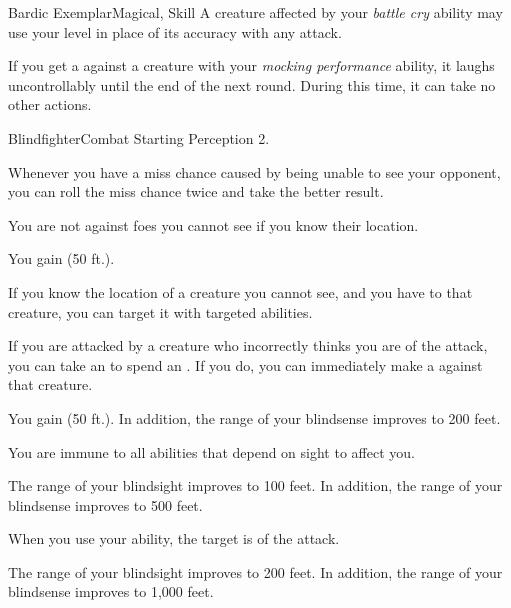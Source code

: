 \begin{feat}{Bardic Exemplar}{Magical, Skill}
         A creature affected by your \textit{battle cry} ability may use your level in place of its accuracy with any attack.

         If you get a  against a creature with your \textit{mocking performance} ability, it laughs uncontrollably until the end of the next round.
        During this time, it can take no other actions.
    \end{feat}

    \begin{feat}{Blindfighter}{Combat}
        \featpre Starting Perception 2.
        \featben
        
         Whenever you have a miss chance caused by being unable to see your opponent, you can roll the miss chance twice and take the better result.

         You are not  against foes you cannot see if you know their location.

         You gain  (50 ft.).

         If you know the location of a creature you cannot see, and you have  to that creature, you can target it with targeted abilities.

         If you are attacked by a creature who incorrectly thinks you are  of the attack, you can take an  to spend an .
        If you do, you can immediately make a  against that creature.

         You gain  (50 ft.).
        In addition, the range of your blindsense improves to 200 feet. 

         You are immune to all abilities that depend on sight to affect you.

         The range of your blindsight improves to 100 feet.
        In addition, the range of your blindsense improves to 500 feet.

         When you use your  ability, the target is  of the attack.

         The range of your blindsight improves to 200 feet.
        In addition, the range of your blindsense improves to 1,000 feet.
    \end{feat}

